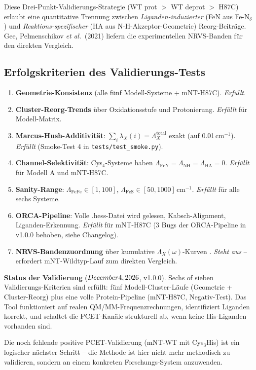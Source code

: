 \documentclass[11pt,a4paper,twoside]{article}
\theoremstyle{remark}
\begin{document}
Diese Drei-Punkt-Validierungs-Strategie (WT prot $>$ WT deprot
$>$ H87C) erlaubt eine quantitative Trennung zwischen
\emph{Liganden-induzierter} (FeN aus Fe-N$_\delta$) und
\emph{Reaktions-spezifischer} (HA aus N-H-Akzeptor-Geometrie)
Reorg-Beitr\"age. Gee, Pelmenschikov \emph{et al.}\ (2021)
\cite{Gee2021} liefern die experimentellen NRVS-Banden f\"ur den
direkten Vergleich.

\subsection{Erfolgskriterien des Validierungs-Tests}
\label{sec:val-erfolgskriterien}

\begin{enumerate}
  \item \textbf{Geometrie-Konsistenz} (alle f\"unf Modell-Systeme +
        mNT-H87C). \emph{Erf\"ullt}.
  \item \textbf{Cluster-Reorg-Trends} \"uber Oxidationsstufe und
        Protonierung. \emph{Erf\"ullt} f\"ur Modell-Matrix.
  \item \textbf{Marcus-Hush-Additivit\"at}: $\sum_i \lambda_X(i) =
        \Lambda_X^\text{total}$ exakt (auf 0.01\,cm$^{-1}$).
        \emph{Erf\"ullt} (Smoke-Test 4 in \texttt{tests/test\_smoke.py}).
  \item \textbf{Channel-Selektivit\"at}: Cys$_4$-Systeme haben
        $\Lambda_\text{FeN} = \Lambda_\text{NH} = \Lambda_\text{HA} = 0$.
        \emph{Erf\"ullt} f\"ur Modell A und mNT-H87C.
  \item \textbf{Sanity-Range}: $\Lambda_\text{FeFe} \in [1, 100]$,
        $\Lambda_\text{FeS} \in [50, 1000]$\,cm$^{-1}$. \emph{Erf\"ullt}
        f\"ur alle sechs Systeme.
  \item \textbf{ORCA-Pipeline}: Volle .hess-Datei wird gelesen,
        Kabsch-Alignment, Liganden-Erkennung. \emph{Erf\"ullt} f\"ur
        mNT-H87C (3 Bugs der ORCA-Pipeline in v1.0.0 behoben, siehe Changelog).
  \item \textbf{NRVS-Bandenzuordnung} \"uber kumulative
        $\Lambda_X(\omega)$-Kurven \cite{Gee2021,Wang2025}.
        \emph{Steht aus} -- erfordert mNT-Wildtyp-Lauf zum
        direkten Vergleich.
\end{enumerate}

\begin{infobox}
\textbf{Status der Validierung} ($\today$, v1.0.0).
Sechs of sieben Validierungs-Kriterien sind erf\"ullt: f\"unf
Modell-Cluster-L\"aufe (Geometrie + Cluster-Reorg) plus eine
volle Protein-Pipeline (mNT-H87C, Negativ-Test). Das Tool
funktioniert auf realen QM/MM-Frequenzrechnungen, identifiziert
Liganden korrekt, und schaltet die PCET-Kan\"ale strukturell ab,
wenn keine His-Liganden vorhanden sind.

Die noch fehlende positive PCET-Validierung (mNT-WT mit Cys$_3$His)
ist ein logischer n\"achster Schritt -- die Methode ist hier nicht
mehr methodisch zu validieren, sondern an einem konkreten
Forschungs-System anzuwenden.
\end{infobox}
\end{document}
